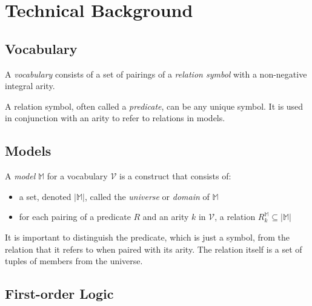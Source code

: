 \section{Technical Background}
\label{sec:technical_background}

	\subsection{Vocabulary}

		A \emph{vocabulary} consists of a set of pairings of a \emph{relation
		symbol} with a non-negative integral arity.

		A relation symbol, often called a \emph{predicate}, can be any unique
		symbol. It is used in conjunction with an arity to refer to relations
		in models.

	\subsection{Models}

		A \emph{model} $\mathbb{M}$ for a vocabulary $\mathcal{V}$ is a construct that consists of:
		\begin{itemize}
		\item a set, denoted $|\mathbb{M}|$, called the \emph{universe} or \emph{domain} of $\mathbb{M}$
		\item for each pairing of a predicate $R$ and an arity $k$ in $\mathcal{V}$, a relation $R^\mathbb{M}_k \subseteq |\mathbb{M}|$
		\end{itemize}
		It is important to distinguish the predicate, which is just a symbol,
		from the relation that it refers to when paired with its arity. The
		relation itself is a set of tuples of members from the universe.

	\subsection{First-order Logic}

